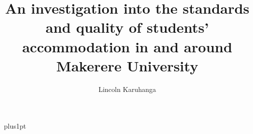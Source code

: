 \documentclass[12pt]{ociamthesis}  %
\title{An investigation into the standards and quality of students'    %
        accommodation in and around Makerere University}   %
\author{Lincoln Karuhanga}             %
\begin{document}
\baselineskip=18pt plus1pt

\setcounter{secnumdepth}{3}
\setcounter{tocdepth}{3}


\maketitle                  %

\begin{romanpages}          %
\tableofcontents            %
\end{romanpages}            %





% 

% 
% 

\end{document}

